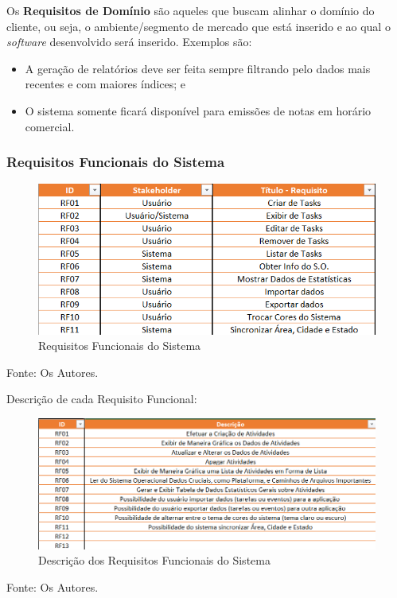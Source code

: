 \documentclass[a4paper,12pt]{article}
\begin{document}
\vspace{1cm}
Os \textbf{Requisitos de Domínio} são aqueles que buscam alinhar o domínio do cliente, ou seja, o ambiente/segmento de 
mercado que está inserido e ao qual o \textit{software} desenvolvido será inserido. Exemplos são:
\begin{itemize}
	\item A geração de relatórios deve ser feita sempre filtrando pelo dados mais recentes e com maiores índices; e
	\item O sistema somente ficará disponível para emissões de notas em horário comercial.
\end{itemize}

\subsubsection{Requisitos Funcionais do Sistema}
\begin{figure}[H]
	\centering
	\includegraphics[scale=0.80]{requirements/functionals/requirements.png}
	\caption{Requisitos Funcionais do Sistema}
\end{figure}
\noindent Fonte: Os Autores.

\pagebreak
Descrição de cada Requisito Funcional:
\begin{figure}[H]
	\centering
	\includegraphics[scale=0.80]{requirements/functionals/description.png}
	\caption{Descrição dos Requisitos Funcionais do Sistema}
\end{figure}
\noindent Fonte: Os Autores.
\end{document}
